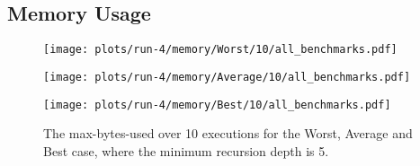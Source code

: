\subsection*{Memory Usage}
\begin{figure}[H]
  \begin{minipage}{.5\textwidth}
    \centering
    \texttt{[image: plots/run-4/memory/Worst/10/all\_benchmarks.pdf]}  
  \end{minipage}
  \begin{minipage}{.5\textwidth}
    \centering
    \texttt{[image: plots/run-4/memory/Average/10/all\_benchmarks.pdf]}  
  \end{minipage}
  \begin{center}
    \begin{minipage}[c]{.5\textwidth}
      \centering
      \texttt{[image: plots/run-4/memory/Best/10/all\_benchmarks.pdf]}  
    \end{minipage}
  \end{center}
  \caption{The max-bytes-used over 10 executions for the Worst, Average and Best case, where the minimum recursion depth is 5.}
  \label{fig-mem-usage-policy-rec-depth-5}
\end{figure}

